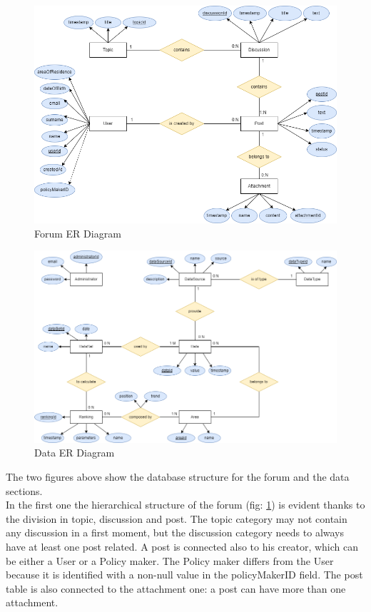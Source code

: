 \begin{figure}[h!]
        \centering
        \includegraphics[scale=0.35]{images/er_diagrams/forum_er_diagram.png}
        \caption{Forum ER Diagram}
        \label{fig:forum_er_diagram}
\end{figure}
\FloatBarrier

\begin{figure}[h!]
        \centering
        \includegraphics[scale=0.35]{images/er_diagrams/data_er_diagram.png}
        \caption{Data ER Diagram}
        \label{fig:data_er_diagram}
\end{figure}
\FloatBarrier

The two figures above show the database structure for the forum and the data sections.\\
In the first one the hierarchical structure of the forum (fig: \ref{fig:forum_er_diagram}) is evident thanks to the division in topic, discussion and post. The topic category may not contain any discussion in a first moment, but the discussion category needs to always have at least one post related. A post is connected also to his creator, which can be either a User or a Policy maker. The Policy maker differs from the User because it is identified with a non-null value in the policyMakerID field.
The post table is also connected to the attachment one: a post can have more than one attachment.\\

